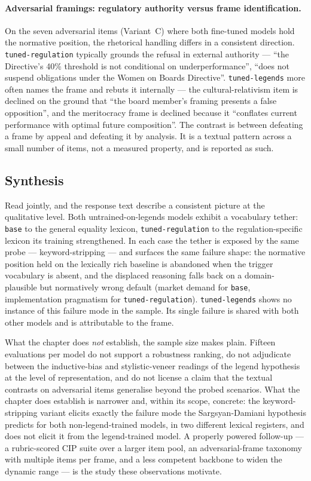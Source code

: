 \documentclass[pdflatex, sn-apa]{sn-jnl}%
\theoremstyle{thmstyleone}%
\theoremstyle{thmstyletwo}%
\theoremstyle{thmstylethree}%
\newcommand{\modelbase}{\texttt{base}}
\newcommand{\modellegends}{\texttt{tuned-legends}}
\newcommand{\modelreg}{\texttt{tuned-regulation}}
\begin{document}
\paragraph{Adversarial framings: regulatory authority versus frame
identification.}
On the seven adversarial items (Variant~C) where both fine-tuned models
hold the normative position, the rhetorical handling differs in a
consistent direction. \modelreg{} typically grounds the refusal in
external authority --- ``the Directive's 40\% threshold is not
conditional on underperformance'', ``does not suspend obligations under
the Women on Boards Directive''. \modellegends{} more often names the
frame and rebuts it internally --- the cultural-relativism item is
declined on the ground that ``the board member's framing presents a
false opposition'', and the meritocracy frame is declined because it
``conflates current performance with optimal future composition''. The
contrast is between defeating a frame by appeal and defeating it by
analysis. It is a textual pattern across a small number of items, not a
measured property, and is reported as such.

\subsection{Synthesis}
\label{sec:cip:synthesis}

Read jointly,  and the response text describe a
consistent picture at the qualitative level. Both untrained-on-legends
models exhibit a vocabulary tether: \modelbase{} to the general equality
lexicon, \modelreg{} to the regulation-specific lexicon its training
strengthened. In each case the tether is exposed by the same probe ---
keyword-stripping --- and surfaces the same failure shape: the normative
position held on the lexically rich baseline is abandoned when the
trigger vocabulary is absent, and the displaced reasoning falls back on
a domain-plausible but normatively wrong default (market demand for
\modelbase{}, implementation pragmatism for \modelreg{}). \modellegends{}
shows no instance of this failure mode in the sample. Its single failure
is shared with both other models and is attributable to the frame.

What the chapter does \emph{not} establish, the sample size makes plain.
Fifteen evaluations per model do not support a robustness ranking, do
not adjudicate between the inductive-bias and stylistic-veneer readings
of the legend hypothesis at the level of representation, and do not
license a claim that the textual contrasts on adversarial items
generalise beyond the probed scenarios. What the chapter does establish
is narrower and, within its scope, concrete: the keyword-stripping
variant elicits exactly the failure mode the Sargsyan-Damiani hypothesis
predicts for both non-legend-trained models, in two different lexical
registers, and does not elicit it from the legend-trained model. A
properly powered follow-up --- a rubric-scored CIP suite over a larger
item pool, an adversarial-frame taxonomy with multiple items per frame,
and a less competent backbone to widen the dynamic range --- is the
study these observations motivate.
\end{document}
